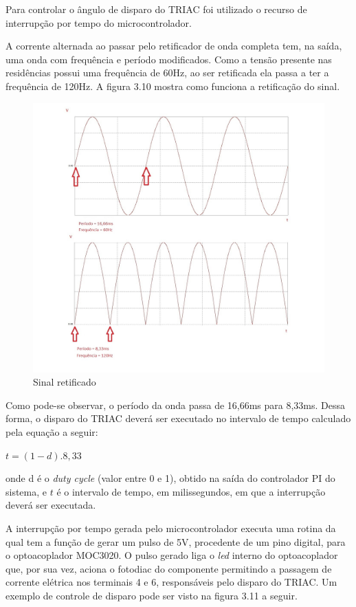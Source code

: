 Para controlar o ângulo de disparo do TRIAC foi utilizado o recurso de interrupção por tempo do microcontrolador.

A corrente alternada ao passar pelo retificador de onda completa tem, na saída, uma onda com frequência e período modificados. Como a tensão presente nas residências possui uma frequência de 60Hz, ao ser retificada ela passa a ter a frequência de 120Hz. A figura 3.10 mostra como funciona a retificação do sinal.

\begin{figure}[H]

\center

\includegraphics[width=12cm]{imagens/retificacao_sinal.jpg}

\label{Sinal retificado}

\caption{Sinal retificado}
\end{figure}


Como pode-se observar, o período da onda passa de 16,66ms para 8,33ms. Dessa forma, o disparo do TRIAC deverá ser executado no intervalo de tempo calculado pela equação a seguir:

\begin{center}
$t = (1-d).8,33$
\end{center}
\noindent onde d é o \textit{duty cycle} (valor entre 0 e 1), obtido na saída do controlador PI do sistema, e $t$ é o intervalo de tempo, em milissegundos, em que a interrupção deverá ser executada. 

A interrupção por tempo gerada pelo microcontrolador executa uma rotina da qual tem a função de gerar um pulso de 5V, procedente de um pino digital, para o optoacoplador MOC3020. O pulso gerado liga o \textit{led} interno do optoacoplador que, por sua vez, aciona o fotodiac do componente permitindo a passagem de corrente elétrica nos terminais 4 e 6, responsáveis pelo disparo do TRIAC. Um exemplo de controle de disparo pode ser visto na figura 3.11 a seguir.


